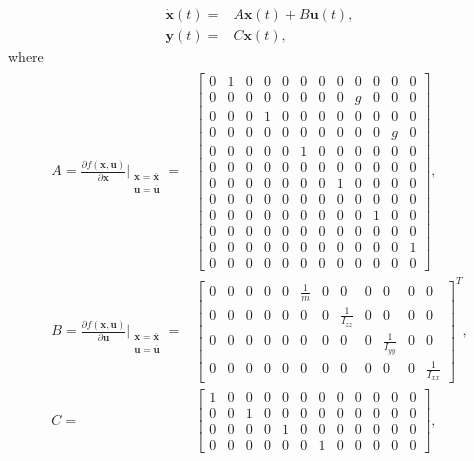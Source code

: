 \begin{align*}
\dot{\mathbf{x}}(t) = & A\mathbf{x}(t)+B\mathbf{u}(t),\\
\mathbf{y}(t) = & C\mathbf{x}(t),
\end{align*}
where
\begin{align}
\begin{split}
A  = \frac{\partial f(\mathbf{x},\mathbf{u})}{\partial \mathbf{x}}\Bigr|_{\substack{\mathbf{x}=\overline{\mathbf{x}}\\\mathbf{u}=\overline{\mathbf{u}}}} = & 
\begin{bmatrix}
0 & 1 & 0 & 0 & 0 & 0 & 0 & 0 & 0 & 0 & 0 & 0\\[2px]
0 & 0 & 0 & 0 & 0 & 0 & 0 & 0 & g & 0 & 0 & 0\\[2px]
0 & 0 & 0 & 1 & 0 & 0 & 0 & 0 & 0 & 0 & 0 & 0\\[2px]
0 & 0 & 0 & 0 & 0 & 0 & 0 & 0 & 0 & 0 & g & 0\\[2px]
0 & 0 & 0 & 0 & 0 & 1 & 0 & 0 & 0 & 0 & 0 & 0\\[2px]
0 & 0 & 0 & 0 & 0 & 0 & 0 & 0 & 0 & 0 & 0 & 0\\[2px]
0 & 0 & 0 & 0 & 0 & 0 & 0 & 1 & 0 & 0 & 0 & 0\\[2px]
0 & 0 & 0 & 0 & 0 & 0 & 0 & 0 & 0 & 0 & 0 & 0\\[2px]
0 & 0 & 0 & 0 & 0 & 0 & 0 & 0 & 0 & 1 & 0 & 0\\[2px]
0 & 0 & 0 & 0 & 0 & 0 & 0 & 0 & 0 & 0 & 0 & 0\\[2px]
0 & 0 & 0 & 0 & 0 & 0 & 0 & 0 & 0 & 0 & 0 & 1\\[2px]
0 & 0 & 0 & 0 & 0 & 0 & 0 & 0 & 0 & 0 & 0 & 0
\end{bmatrix}, \\[15px]
B = \frac{\partial f(\mathbf{x},\mathbf{u})}{\partial \mathbf{u}}\Bigr|_{\substack{\mathbf{x}=\overline{\mathbf{x}}\\\mathbf{u}=\overline{\mathbf{u}}}} = & 
\begin{bmatrix}
0 & 0 & 0 & 0 & 0 & \frac{1}{m} & 0 & 0 & 0 & 0 & 0 & 0\\[5px]
0 & 0 & 0 & 0 & 0 & 0 & 0 & \frac{1}{I_{zz}} & 0 & 0 & 0 & 0\\[5px]
0 & 0 & 0 & 0 & 0 & 0 & 0 & 0 & 0 & \frac{1}{I_{yy}} & 0 & 0\\[5px]
0 & 0 & 0 & 0 & 0 & 0 & 0 & 0 & 0 & 0 & 0 & \frac{1}{I_{xx}}
\end{bmatrix}^{T},\\[15px]
C = &
\begin{bmatrix}
1 & 0 & 0 & 0 & 0 & 0 & 0 & 0 & 0 & 0 & 0 & 0\\
0 & 0 & 1 & 0 & 0 & 0 & 0 & 0 & 0 & 0 & 0 & 0\\
0 & 0 & 0 & 0 & 1 & 0 & 0 & 0 & 0 & 0 & 0 & 0\\
0 & 0 & 0 & 0 & 0 & 0 & 1 & 0 & 0 & 0 & 0 & 0 
\end{bmatrix},
\end{split}
\end{align}

